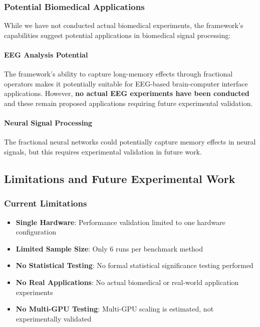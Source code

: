 \subsubsection{Potential Biomedical Applications}

While we have not conducted actual biomedical experiments, the framework's capabilities suggest potential applications in biomedical signal processing:

\paragraph{EEG Analysis Potential}
The framework's ability to capture long-memory effects through fractional operators makes it potentially suitable for EEG-based brain-computer interface applications. However, \textbf{no actual EEG experiments have been conducted} and these remain proposed applications requiring future experimental validation.

\paragraph{Neural Signal Processing}
The fractional neural networks could potentially capture memory effects in neural signals, but this requires experimental validation in future work.

\subsection{Limitations and Future Experimental Work}

\subsubsection{Current Limitations}

\begin{itemize}
    \item \textbf{Single Hardware}: Performance validation limited to one hardware configuration
    \item \textbf{Limited Sample Size}: Only 6 runs per benchmark method
    \item \textbf{No Statistical Testing}: No formal statistical significance testing performed
    \item \textbf{No Real Applications}: No actual biomedical or real-world application experiments
    \item \textbf{No Multi-GPU Testing}: Multi-GPU scaling is estimated, not experimentally validated
\end{itemize}

